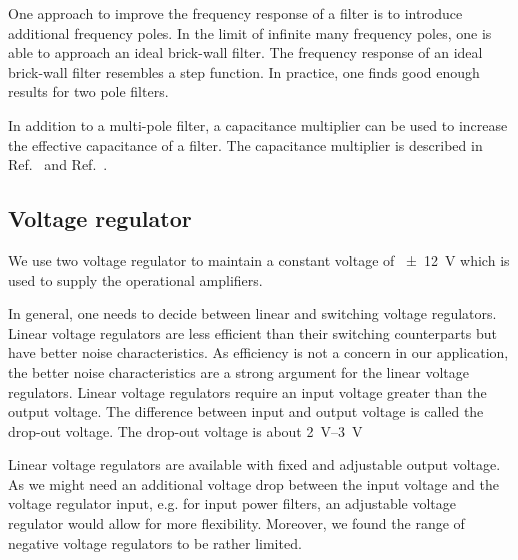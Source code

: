One approach to improve the frequency response of a filter is to introduce additional frequency poles.
In the limit of infinite many frequency poles, one is able to approach an ideal brick-wall filter.
The frequency response of an ideal brick-wall filter resembles a step function.
In practice, one finds good enough results for two pole filters.

In addition to a multi-pole filter, a capacitance multiplier can be used to increase the effective capacitance of a filter.
The capacitance multiplier is described in Ref.~\cite[p.~536]{Hobbs11} and Ref.~\cite[p.~578]{Horowitz15}.

\subsection{Voltage regulator}

We use two voltage regulator to maintain a constant voltage of \SI{\pm12}{\volt} which is used to supply the operational amplifiers.

In general, one needs to decide between linear and switching voltage regulators.
Linear voltage regulators are less efficient than their switching counterparts but have better noise characteristics.
As efficiency is not a concern in our application, the better noise characteristics are a strong argument for the linear voltage regulators.
Linear voltage regulators require an input voltage greater than the output voltage.
The difference between input and output voltage is called the drop-out voltage.
The drop-out voltage is about \SIrange{2}{3}{\volt}

Linear voltage regulators are available with fixed and adjustable output voltage.
As we might need an additional voltage drop between the input voltage and the voltage regulator input, e.g. for input power filters, an adjustable voltage regulator would allow for more flexibility.
Moreover, we found the range of negative voltage regulators to be rather limited.

